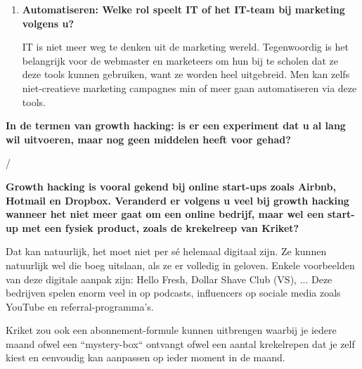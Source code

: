 \begin{enumerate}[label*=\arabic*.]
	Data verzamelen is de dag van vandaag zo makkelijk en uiteraard verschrikkelijk belangrijk, zeker wanneer men viraal gaat als bedrijf. Het belang van data is groot, maar het is wel dubbel.
	Men moet de data laten spreken, bijvoorbeeld bij een A/B-test\footnote{Bij A/B testen worden twee opties vergeleken bij een groep mensen, ieder krijgt ofwel A ofwel B en de conversies worden gebruikt als meetstaaf.}. Maar men moet niet verblind worden door de data, het grote geheel moet steeds bekeken worden. Soms zijn er andere factoren die de data hebben beïnvloed en die moeten natuurlijk worden meegenomen in het verhaal.
	
	Emotie is bijvoorbeeld iets dat moeilijk vatbaar is of ``brand awareness``, dit is niet makkelijk om te meten. Dit is duidelijk bij GDN (Google Display Network) banners. Wanneer men puur naar de cijfers kijkt, zijn GDN banners helemaal niet winstgevend. Hierbij moet men denken aan een groot reclamebord, dat is ook niet meteen winstgevend, maar het zorgt ervoor dat mensen het bedrijf leren kennen. Zo'n banners of reclameborden blijven de mensen wel bij en kan later, indirect, invloed hebben op de verkoop.
	
	\item \textbf{Automatiseren: Welke rol speelt IT of het IT-team bij marketing volgens u? }
	
	IT is niet meer weg te denken uit de marketing wereld. Tegenwoordig is het belangrijk voor de webmaster en marketeers om hun bij te scholen dat ze deze tools kunnen gebruiken, want ze worden heel uitgebreid. Men kan zelfs niet-creatieve marketing campagnes min of meer gaan automatiseren via deze tools. 
	
\end{enumerate}
\textbf{In de termen van growth hacking: is er een experiment dat u al lang wil uitvoeren, maar nog geen middelen heeft voor gehad?}

	/

\textbf{Growth hacking is vooral gekend bij online start-ups zoals Airbnb, Hotmail en Dropbox. Veranderd er volgens u veel bij growth hacking wanneer het niet meer gaat om een online bedrijf, maar wel een start-up met een fysiek product, zoals de krekelreep van Kriket?}

Dat kan natuurlijk, het moet niet per sé helemaal digitaal zijn. Ze kunnen natuurlijk wel die boeg uitslaan, als ze er volledig in geloven. Enkele voorbeelden van deze digitale aanpak zijn: Hello Fresh, Dollar Shave Club (VS), ... Deze bedrijven spelen enorm veel in op podcasts, influencers op sociale media zoals YouTube en referral-programma's. 

Kriket zou ook een abonnement-formule kunnen uitbrengen waarbij je iedere maand ofwel een ``mystery-box`` ontvangt ofwel een aantal krekelrepen dat je zelf kiest en eenvoudig kan aanpassen op ieder moment in de maand.


